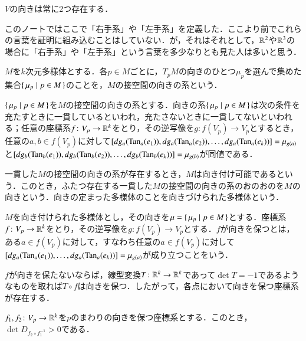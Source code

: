 \begin{que}
$V$の向きは常に2つ存在する．
\end{que}

\begin{dig}
このノートではここで「右手系」や「左手系」を定義した．ここより前でこれらの言葉を証明に組み込むことはしていない．が，それはそれとして，$\mathbb{R}^2$や$\mathbb{R}^3$の場合に「右手系」や「左手系」という言葉を多少なりとも見た人は多いと思う．
\end{dig}

\begin{defi}
$M$を$k$次元多様体とする．各$p \in M$ごとに，$T_pM$の向きのひとつ$\mu_p$を選んで集めた集合$\set{\mu_p | p \in M}$のことを，$M$の接空間の向きの系という．

$\set{\mu_p | p \in M}$を$M$の接空間の向きの系とする．向きの系$\set{\mu_p | p \in M}$は次の条件を充たすときに一貫しているといわれ，充たさないときに一貫してないといわれる；任意の座標系$f \colon V_p \to \mathbb{R}^k$をとり，その逆写像を$g \colon f(V_p) \to V_p$とするとき，任意の$a,b \in f(V_p)$に対して$[dg_a(\operatorname{Tan}_a(e_1)), dg_a(\operatorname{Tan}_a(e_2)), \dots, dg_a(\operatorname{Tan}_a(e_k))] = \mu_{g(a)}$と$[dg_b(\operatorname{Tan}_b(e_1)), dg_b(\operatorname{Tan}_b(e_2)), \dots, dg_b(\operatorname{Tan}_b(e_k))] = \mu_{g(b)}$が同値である．

一貫した$M$の接空間の向きの系が存在するとき，$M$は向き付け可能であるという．このとき，ふたつ存在する一貫した$M$の接空間の向きの系のおのおのを$M$の向きという．向きの定まった多様体のことを向きづけられた多様体という．
\end{defi}

\begin{defi}
$M$を向き付けられた多様体とし，その向きを$\mu = \set{\mu_p | p \in M}$とする．座標系$f \colon V_p \to \mathbb{R}^k$をとり，その逆写像を$g \colon f(V_p) \to V_p$とする．$f$が向きを保つとは，ある$a \in f(V_p)$に対して，すなわち任意の$a \in f(V_p)$に対して$[dg_a(\operatorname{Tan}_a(e_1)), \dots, dg_a(\operatorname{Tan}_a(e_k))] = \mu_{g(a)}$が成り立つことをいう．
\end{defi}

$f$が向きを保たないならば，線型変換$T \colon \mathbb{R}^k \to \mathbb{R}^k$であって$\det T = -1$であるようなものを取れば$T \circ f$は向きを保つ．したがって，各点において向きを保つ座標系が存在する．

\begin{lem}
$f_1, f_2 \colon V_p \to \mathbb{R}^k$を$p$のまわりの向きを保つ座標系とする．このとき，$\det D_{f_2 \circ f_1^{-1}} > 0$である．
\end{lem}

